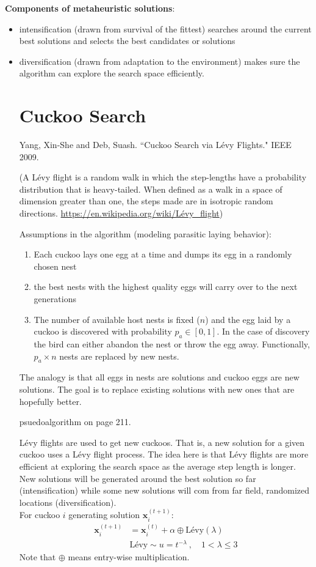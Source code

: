\documentclass[12pt,twoside]{article}
\begin{document}
\vspace*{1 em}
\textbf{Components of metaheuristic solutions}: 
\begin{itemize}
\item intensification (drawn from survival of the fittest) searches around the current best solutions and selects the best candidates or solutions
\item diversification (drawn from adaptation to the environment) makes sure the algorithm can explore the search space efficiently.

\section*{Cuckoo Search}
Yang, Xin-She and Deb, Suash. ``Cuckoo Search via L\'evy Flights." IEEE 2009.

(A L\'evy flight is a random walk in which the step-lengths have a probability distribution that is heavy-tailed. When defined as a walk in a space of dimension greater than one, the steps made are in isotropic random directions. \href{https://en.wikipedia.org/wiki/Levy_flight}{https://en.wikipedia.org/wiki/L\'evy\_flight})

Assumptions in the algorithm (modeling parasitic laying behavior):
\begin{enumerate}
\item Each cuckoo lays one egg at a time and dumps its egg in a randomly chosen nest
\item the best nests with the highest quality eggs will carry over to the next generations
\item The number of available host nests is fixed ($n$) and the egg laid by a cuckoo is discovered with probability $p_a \in [0,1]$. In the case of discovery the bird can either abandon the nest or throw the egg away. Functionally, $p_a \times n$ nests are replaced by new nests.
\end{enumerate}
%
The analogy is that all eggs in nests are solutions and cuckoo eggs are new solutions. The goal is to replace existing solutions with new ones that are hopefully better.

psuedoalgorithm on page 211. 

L\'evy flights are used to get new cuckoos. That is, a new solution for a given cuckoo uses a L\'evy flight process. The idea here is that L\'evy flights are more efficient at exploring the search space as the average step length is longer. New solutions will be generated around the best solution so far (intensification) while some new solutions will com from far field, randomized locations (diversification). \\
For cuckoo $i$ generating solution $\mathbf{x}_i^{(t+1)}$:
\begin{align*}
\mathbf{x}_i^{(t+1)} &= \mathbf{x}_i^{(t)} + \alpha \oplus \text{L\'evy}(\lambda)\\
&\text{L\'evy} \sim u = t^{-\lambda} \:, \quad 1 < \lambda \leq 3
\end{align*}
Note that $\oplus$ means entry-wise multiplication.


\end{itemize}
\end{document}

